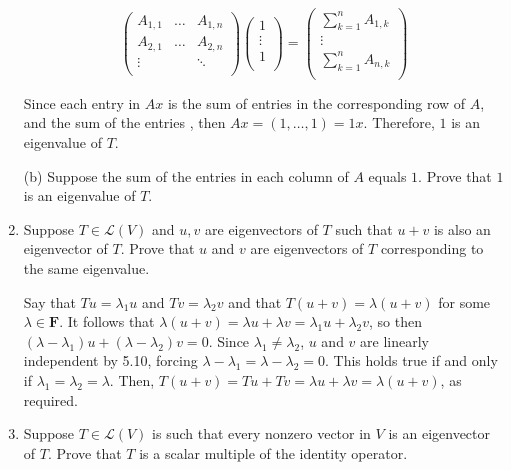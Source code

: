 \documentclass{book}
\begin{document}
\begin{enumerate}
\begin{equation*}
    \begin{pmatrix}
        A_{1,1} & \dots & A_{1,n} \\
        A_{2,1} & \dots & A_{2,n} \\
        \vdots & & \ddots \\
    \end{pmatrix}
    \begin{pmatrix}
        1 \\
        \vdots \\
        1 \\
    \end{pmatrix}
    =
    \begin{pmatrix}
        \sum_{k=1}^{n} A_{1,k} \\
        \vdots \\
        \sum_{k=1}^{n} A_{n,k} \\
    \end{pmatrix}
\end{equation*}

Since each entry in \(Ax\) is the sum of entries in the corresponding row of \(A\), and the sum of the entries , then \(Ax=(1,\dots,1)=1x\).  Therefore, \(1\) is an eigenvalue of \(T\).

(b) Suppose the sum of the entries in each column of \(A\) equals \(1\).  Prove that \(1\) is an eigenvalue of \(T\).



\item Suppose \(T \in \mathcal{L}(V)\) and \(u,v\) are eigenvectors of \(T\) such that \(u+v\) is also an eigenvector of \(T\).  Prove that \(u\) and \(v\) are eigenvectors of \(T\) corresponding to the same eigenvalue.

Say that \(Tu=\lambda_1u\) and \(Tv=\lambda_2v\) and that \(T(u+v) = \lambda(u+v)\) for some \(\lambda \in \textbf{F}\).  It follows that \(\lambda(u+v) = \lambda u + \lambda v = \lambda_1 u + \lambda_2 v\), so then \((\lambda - \lambda_1)u + (\lambda - \lambda_2)v = 0\).  Since \(\lambda_1 \neq \lambda_2\), \(u\) and \(v\) are linearly independent by 5.10, forcing \(\lambda - \lambda_1 = \lambda - \lambda_2 = 0\).  This holds true if and only if \(\lambda_1 = \lambda_2 = \lambda\).  Then, \(T(u+v) = Tu+Tv=\lambda u + \lambda v = \lambda(u+v)\), as required.

\item Suppose \(T \in \mathcal{L}(V)\) is such that every nonzero vector in \(V\) is an eigenvector of \(T\).  Prove that \(T\) is a scalar multiple of the identity operator.


\end{enumerate}
\end{document}
